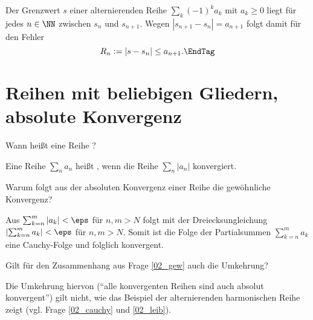 \begin{antwort} Der Grenzwert $s$ einer alternierenden Reihe $\sum_k (-1)^ka_k$ 
  mit $a_k\ge 0$ liegt für jedes $n\in\NN$ zwischen $s_n$ und $s_{n+1}$. 
  Wegen  $|s_{n+1}-s_n| = a_{n+1}$ folgt damit für den Fehler 
  \begin{equation}
    R_n := \left| s- s_n \right| \le a_{n+1}. \EndTag
  \end{equation}
  
\end{antwort}




\section{Reihen mit beliebigen Gliedern, absolute Konvergenz}

\begin{frage}\label{02_abs}
  Wann heißt eine Reihe ?
\end{frage}

\begin{antwort}
  Eine Reihe $\sum_n a_n$ heißt , 
  wenn die Reihe $\sum_n |a_n|$ konvergiert. \AntEnd
\end{antwort}

\begin{frage}\label{02_gew}
  Warum folgt aus der absoluten Konvergenz einer Reihe die gewöhnliche 
  Konvergenz? 
\end{frage}

\begin{antwort}
  Aus $\sum_{k=n}^m |a_k| < \eps$ für $n,m>N$ folgt mit 
  der Dreiecksungleichung $\left| \sum_{k=n}^m a_k \right| < \eps$ für $n,m>N$.   
  Somit ist die Folge der Partialsummen $\sum_{k=n}^m a_k$ 
  eine Cauchy-Folge und folglich konvergent. 
  \AntEnd
\end{antwort}

\begin{frage}
  Gilt für den Zusammenhang aus Frage \ref{02_gew} auch die Umkehrung?
\end{frage}

\begin{antwort}
  Die Umkehrung hiervon ("`alle konvergenten Reihen sind auch absolut 
  konvergent"') gilt nicht, 
  wie das Beispiel der alternierenden harmonischen 
  Reihe zeigt (vgl. Frage \ref{02_cauchy} und 
  \ref{02_leib}).  \AntEnd
\end{antwort}

